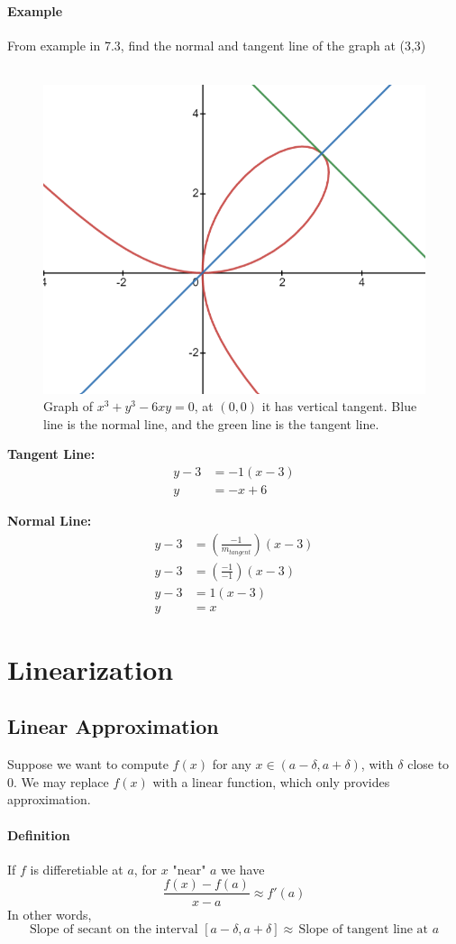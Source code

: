\documentclass[12pt]{article}
\begin{document}
\paragraph{Example} From example in 7.3, find the normal and tangent line of the graph at (3,3) \\
\\ 
\begin{figure}[h!] 
    \centering
    \includegraphics[width= 0.3\linewidth]{Images/normal line.png}
    \caption{Graph of $x^3 + y^3 -6xy = 0$, at $(0,0)$ it has vertical tangent. 
    Blue line is the normal line, and the green line is the tangent line.}
\end{figure}
\textbf{Tangent Line: } 
\begin{align*} 
    y - 3 &= - 1(x - 3) \\
    y &= - x + 6
\end{align*}

\noindent
\textbf{Normal Line: }
\begin{align*} 
    y - 3 &= \left(\frac{ - 1}{m_{tangent}} \right) (x - 3) \\
    y - 3 &= \left(\frac{ -1}{ - 1} \right) (x - 3) \\
    y - 3 &= 1(x - 3) \\
    y &= x
\end{align*}

\section{Linearization}
\subsection{Linear Approximation}
Suppose we want to compute $f(x)$ for any $x \in (a - \delta , a + \delta)$, with $\delta$ close to 0. 
We may replace $f(x)$ with a linear function, which only provides approximation.

\paragraph{Definition}
If $f$ is differetiable at $a$, for $x$ "near" $a$ we have
\[
    \frac{f(x) - f(a)}{x - a} \approx f'(a) 
\]
In other words,
\[
    \textrm{Slope of secant on the interval } [a - \delta, a + \delta] \approx\,\textrm{Slope of tangent line at } a
\]
\end{document}
